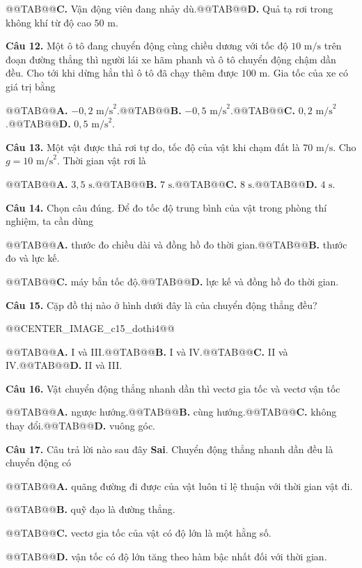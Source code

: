 \documentclass[11pt,a4paper]{article}
\begin{document}
@@TAB@@\textbf{C.} Vận động viên đang nhảy dù.@@TAB@@\textbf{D.} Quả tạ rơi trong không khí từ độ cao $50\text{ m}$.

\textbf{Câu 12.} Một ô tô đang chuyển động cùng chiều dương với tốc độ $10\text{ m/s}$ trên đoạn đường thẳng thì người lái xe hãm phanh và ô tô chuyển động chậm dần đều. Cho tới khi dừng hẳn thì ô tô đã chạy thêm được $100\text{ m}$. Gia tốc của xe có giá trị bằng

@@TAB@@\textbf{A.} $-0{,}2\text{ m/s}^2$.@@TAB@@\textbf{B.} $-0{,}5\text{ m/s}^2$.@@TAB@@\textbf{C.} $0{,}2\text{ m/s}^2$.@@TAB@@\textbf{D.} $0{,}5\text{ m/s}^2$.

\textbf{Câu 13.} Một vật được thả rơi tự do, tốc độ của vật khi chạm đất là $70\text{ m/s}$. Cho $g = 10\text{ m/s}^2$. Thời gian vật rơi là

@@TAB@@\textbf{A.} $3{,}5\text{ s}$.@@TAB@@\textbf{B.} $7\text{ s}$.@@TAB@@\textbf{C.} $8\text{ s}$.@@TAB@@\textbf{D.} $4\text{ s}$.

\textbf{Câu 14.} Chọn câu đúng. Để đo tốc độ trung bình của vật trong phòng thí nghiệm, ta cần dùng

@@TAB@@\textbf{A.} thước đo chiều dài và đồng hồ đo thời gian.@@TAB@@\textbf{B.} thước đo và lực kế.

@@TAB@@\textbf{C.} máy bắn tốc độ.@@TAB@@\textbf{D.} lực kế và đồng hồ đo thời gian.

\textbf{Câu 15.} Cặp đồ thị nào ở hình dưới đây là của chuyển động thẳng đều?

@@CENTER_IMAGE_c15_dothi4@@

@@TAB@@\textbf{A.} I và III.@@TAB@@\textbf{B.} I và IV.@@TAB@@\textbf{C.} II và IV.@@TAB@@\textbf{D.} II và III.

\textbf{Câu 16.} Vật chuyển động thẳng nhanh dần thì vectơ gia tốc và vectơ vận tốc

@@TAB@@\textbf{A.} ngược hướng.@@TAB@@\textbf{B.} cùng hướng.@@TAB@@\textbf{C.} không thay đổi.@@TAB@@\textbf{D.} vuông góc.

\textbf{Câu 17.} Câu trả lời nào sau đây \textbf{Sai}. Chuyển động thẳng nhanh dần đều là chuyển động có

@@TAB@@\textbf{A.} quãng đường đi được của vật luôn tỉ lệ thuận với thời gian vật đi.

@@TAB@@\textbf{B.} quỹ đạo là đường thẳng.

@@TAB@@\textbf{C.} vectơ gia tốc của vật có độ lớn là một hằng số.

@@TAB@@\textbf{D.} vận tốc có độ lớn tăng theo hàm bậc nhất đối với thời gian.
\end{document}
